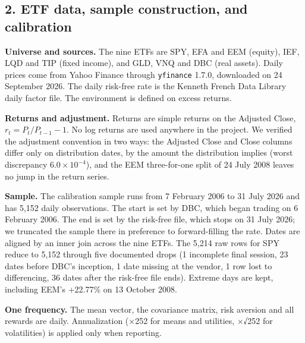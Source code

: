 \documentclass[
  11pt]{article}
\begin{document}
\subsection{2. ETF data, sample construction, and
calibration}\label{etf-data-sample-construction-and-calibration}

\textbf{Universe and sources.} The nine ETFs are SPY, EFA and EEM
(equity), IEF, LQD and TIP (fixed income), and GLD, VNQ and DBC (real
assets). Daily prices come from Yahoo Finance through \texttt{yfinance}
1.7.0, downloaded on 24 September 2026. The daily risk-free rate is the
Kenneth French Data Library daily factor file. The environment is
defined on excess returns.

\textbf{Returns and adjustment.} Returns are simple returns on the
Adjusted Close, \(r_t = P_t / P_{t-1} - 1\). No log returns are used
anywhere in the project. We verified the adjustment convention in two
ways: the Adjusted Close and Close columns differ only on distribution
dates, by the amount the distribution implies (worst discrepancy
\(6.0 \times 10^{-4}\)), and the EEM three-for-one split of 24 July 2008
leaves no jump in the return series.

\textbf{Sample.} The calibration sample runs from 7 February 2006 to 31
July 2026 and has 5,152 daily observations. The start is set by DBC,
which began trading on 6 February 2006. The end is set by the risk-free
file, which stops on 31 July 2026; we truncated the sample there in
preference to forward-filling the rate. Dates are aligned by an inner
join across the nine ETFs. The 5,214 raw rows for SPY reduce to 5,152
through five documented drops (1 incomplete final session, 23 dates
before DBC's inception, 1 date missing at the vendor, 1 row lost to
differencing, 36 dates after the risk-free file ends). Extreme days are
kept, including EEM's +22.77\% on 13 October 2008.

\textbf{One frequency.} The mean vector, the covariance matrix, risk
aversion and all rewards are daily. Annualization (×252 for means and
utilities, ×√252 for volatilities) is applied only when reporting.
\end{document}
